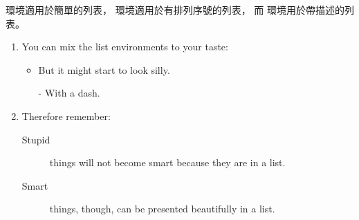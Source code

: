  環境適用於簡單的列表， 環境適用於有排列序號的列表， 而  環境用於帶描述的列表。 


\begin{example}
\flushleft
\begin{enumerate}
\item You can mix the list
environments to your taste:
\begin{itemize}
\item But it might start to
look silly.
\item[-] With a dash.
\end{itemize}
\item Therefore remember:
\begin{description}
\item[Stupid] things will not
become smart because they are
in a list.
\item[Smart] things, though,
can be presented beautifully
in a list.
\end{description}
\end{enumerate}
\end{example}


